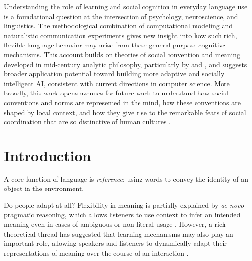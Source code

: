 \documentclass[11pt]{article}
\begin{document}
Understanding the role of learning and social cognition in everyday language use is a foundational question at the intersection of psychology, neuroscience, and linguistics. 
The methodological combination of computational modeling and naturalistic communication experiments gives new insight into how such rich, flexible language behavior may arise from these general-purpose cognitive mechanisms.
This account builds on theories of social convention and meaning developed in mid-century analytic philosophy, particularly by  and , and suggests broader application potential toward building more adaptive and socially intelligent AI, consistent with current directions in computer science. 
More broadly, this work opens avenues for future work to understand how social conventions and norms are represented in the mind, how these conventions are shaped by local context, and how they give rise to the remarkable feats of social coordination that are so distinctive of human cultures \cite{hawkins2019emergence}.

\section*{Introduction}

A core function of language is \emph{reference}: using words to convey the identity of an object in the environment. 

Do people adapt at all? 
Flexibility in meaning is partially explained by \emph{de novo} pragmatic reasoning, which allows listeners to use context to infer an intended meaning even in cases of ambiguous or non-literal usage \cite{Clark83_NonceSense,LascaridesCopestake98_PragmaticsWordMeaning,Glucksberg01_FigurativeLanguage,GoodmanFrank16_RSATiCS}.
However, a rich theoretical thread has suggested that learning mechanisms may also play an important role, allowing speakers and listeners to dynamically adapt their representations of meaning over the course of an interaction \cite{BrennanClark96_ConceptualPactsConversation,pickering2004toward,delaney2019neural}.
\end{document}
